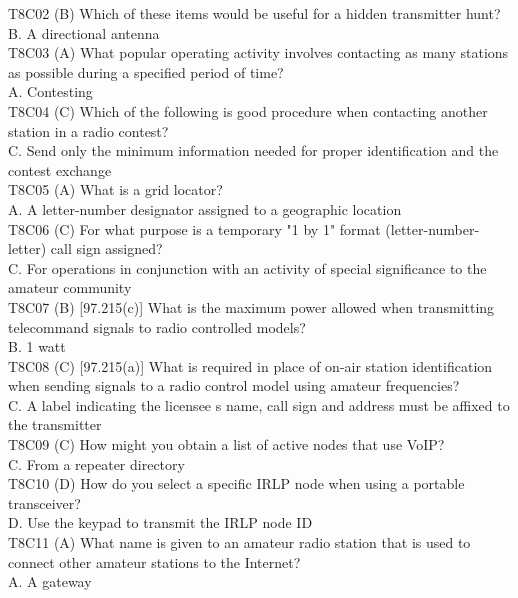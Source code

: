 \documentclass[12pt,letterpaper]{report}
\begin{document}
T8C02 (B) Which of these items would be useful for a hidden transmitter hunt?\\
B. A directional antenna\\

T8C03 (A) What popular operating activity involves contacting as many stations as possible during a specified period of time?\\
A. Contesting\\

T8C04 (C) Which of the following is good procedure when contacting another station in a radio contest?\\
C. Send only the minimum information needed for proper identification and the contest exchange\\

T8C05 (A) What is a grid locator?\\
A. A letter-number designator assigned to a geographic location\\

T8C06 (C) For what purpose is a temporary "1 by 1" format (letter-number-letter) call sign assigned?\\
C. For operations in conjunction with an activity of special significance to the amateur community\\

T8C07 (B) [97.215(c)] What is the maximum power allowed when transmitting telecommand signals to radio controlled models?\\
B. 1 watt\\

T8C08 (C) [97.215(a)] What is required in place of on-air station identification when sending signals to a radio control model using amateur frequencies?\\
C. A label indicating the licensee s name, call sign and address must be affixed to the transmitter\\

T8C09 (C) How might you obtain a list of active nodes that use VoIP?\\
C. From a repeater directory\\

T8C10 (D) How do you select a specific IRLP node when using a portable transceiver?\\
D. Use the keypad to transmit the IRLP node ID\\

T8C11 (A) What name is given to an amateur radio station that is used to connect other amateur stations to the Internet?\\
A. A gateway\\
\end{document}
